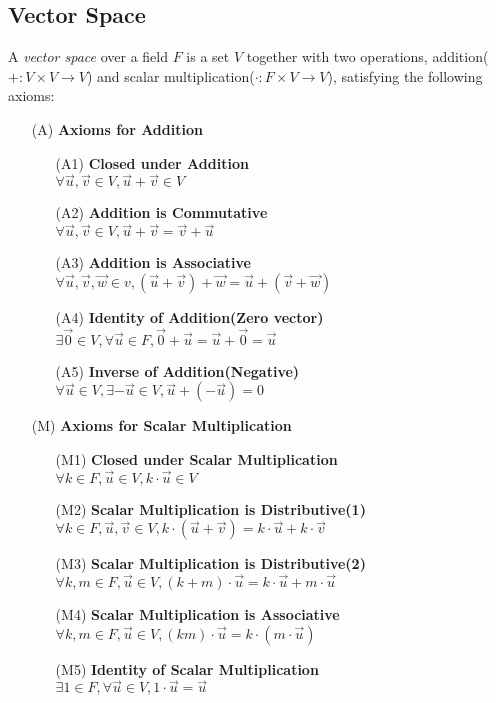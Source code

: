 \documentclass{report}
\begin{document}
		\subsection{Vector Space}\label{chap_vector_space}
		\begin{defn}
			A \emph{vector space} over a field $F$ is a set $V$ together with two operations, addition($+:V\times V \rightarrow V$) and scalar multiplication($\cdot:F \times V \rightarrow V$), satisfying the following axioms:
			\begin{itemize}
				\item[(A)] \textbf{Axioms for Addition}
				\begin{itemize}
					\item[(A1)] \textbf{Closed under Addition}\\$\forall \vec{u} ,\vec{v} \in V, \vec{u}+\vec{v} \in V$
					\item[(A2)] \textbf{Addition is Commutative}\\$\forall \vec{u}, \vec{v} \in V, \vec{u}+\vec{v}=\vec{v}+\vec{u}$
					\item[(A3)] \textbf{Addition is Associative}\\$\forall \vec{u},\vec{v},\vec{w} \in v, (\vec{u}+\vec{v})+\vec{w}=\vec{u}+(\vec{v}+\vec{w})$
					\item[(A4)] \textbf{Identity of Addition(Zero vector)}\\$\exists \vec{0} \in V, \forall \vec{u} \in F, \vec{0}+\vec{u}=\vec{u}+\vec{0}=\vec{u}$
					\item[(A5)] \textbf{Inverse of Addition(Negative)}\\$\forall \vec{u} \in V, \exists -\vec{u} \in V, \vec{u}+(-\vec{u})=0$
				\end{itemize}
				\item[(M)] \textbf{Axioms for Scalar Multiplication}
				\begin{itemize}
					\item[(M1)] \textbf{Closed under Scalar Multiplication}\\$\forall k \in F, \vec{u} \in V, k \cdot \vec{u} \in V$
					\item[(M2)] \textbf{Scalar Multiplication is Distributive(1)}\\$\forall k \in F, \vec{u}, \vec{v} \in V, k \cdot (\vec{u}+\vec{v})=k \cdot \vec{u} + k \cdot \vec{v}$
					\item[(M3)] \textbf{Scalar Multiplication is Distributive(2)}\\$\forall k, m \in F, \vec{u} \in V, (k+m) \cdot \vec{u}=k \cdot \vec{u} + m \cdot \vec{u}$
					\item[(M4)] \textbf{Scalar Multiplication is Associative}\\$\forall k, m \in F, \vec{u} \in V, (km) \cdot \vec{u}=k \cdot (m \cdot \vec{u})$
					\item[(M5)] \textbf{Identity of Scalar Multiplication}\\$\exists 1 \in F, \forall \vec{u} \in V, 1 \cdot \vec{u}=\vec{u}$
				\end{itemize}
			\end{itemize}
		\end{defn}
	
\end{document}
